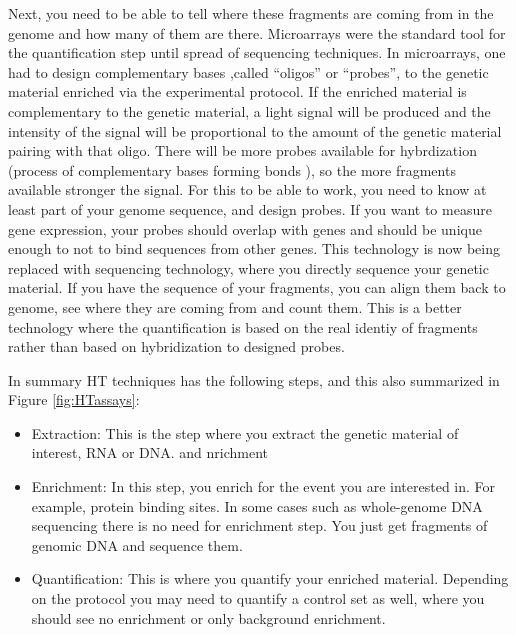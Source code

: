 \documentclass[12pt,]{krantz}
\providecommand{\tightlist}{%
  \setlength{\itemsep}{0pt}\setlength{\parskip}{0pt}}
\begin{document}
Next, you need to be able to
tell where these fragments are coming from in the genome and how many of them
are there. Microarrays were the standard tool for the quantification step
until spread of sequencing techniques. In microarrays, one had to design complementary bases
,called ``oligos'' or ``probes'', to the genetic material enriched via the experimental protocol.
If the enriched material is complementary to the genetic material,
a light signal will
be produced and the intensity of the signal will be proportional to the amount of the
genetic material pairing with that oligo. There will be more probes available for
hybrdization (process of complementary bases forming bonds ), so the more fragments
available stronger the signal. For this to be able to work, you need to know
at least part of your genome sequence, and design probes. If you want to measure
gene expression, your probes should overlap with genes and should be unique
enough to not to bind sequences from other genes. This technology is now being
replaced with sequencing technology, where you directly sequence your genetic
material. If you have the sequence of your fragments, you can align them back
to genome, see where they are coming from and count them. This is a better
technology where the quantification is based on the real identiy of fragments
rather than based on hybridization to designed probes.

In summary HT techniques has the following steps, and this also summarized in
Figure \ref{fig:HTassays}:

\begin{itemize}
\tightlist
\item
  Extraction: This is the step where you extract the genetic
  material of interest, RNA or DNA.
  and nrichment
\item
  Enrichment: In this step, you enrich for the event you are interested
  in. For example, protein binding sites. In some cases such as whole-genome DNA
  sequencing there is no need for enrichment step. You just get fragments of
  genomic DNA and sequence them.
\item
  Quantification: This is where you quantify your enriched material. Depending
  on the protocol you may need to quantify a control set as well, where you
  should see no enrichment or only background enrichment.
\end{itemize}
\end{document}
